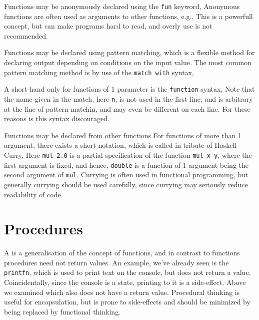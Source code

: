 Functions may be anonymously declared using the \texttt{fun} keyword,
Anonymous functions are often used as arguments to other functions, e.g.,
This is a powerfull concept, but can make programs hard to read, and overly use is not recommended.

Functions may be declared using pattern matching, which is a flexible method for declaring output depending on conditions on the input value. The most common pattern matching method is by use of the \texttt{match with} syntax,

A short-hand only for functions of 1 parameter is the \texttt{function} syntax,
Note that the name given in the match, here \texttt{n}, is not used in the first line, and is arbitrary at the line of pattern matchin, and may even be different on each line. For these reasons is this syntax discouraged.

Functions may be declared from other functions
For functions of more than 1 argument, there exists a short notation, which is called  in tribute of Haskell Curry,
Here \texttt{mul 2.0} is a partial specification of the function \texttt{mul x y}, where the first argument is fixed, and hence, \texttt{double} is a function of 1 argument being the second argument of \texttt{mul}. Currying is often used in functional programming, but generally currying should be used carefully, since currying may seriously reduce readability of code.

\section{Procedures}
A  is a generalisation of the concept of functions, and in contrast to functions procedures need not return values. An example, we've already seen is the \texttt{printfn}, which is used to print text on the console, but does not return a value. Coincidentally, since the console is a state, printing to it is a side-effect. Above we examined 
which also does not have a return value. Procedural thinking is useful for encapsulation, but is prone to side-effects and should be minimized by being replaced by functional thinking.

